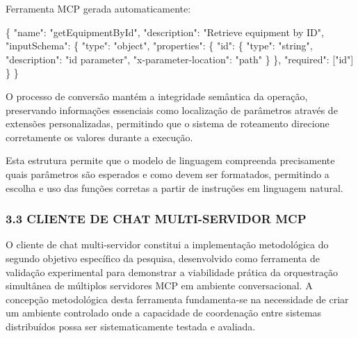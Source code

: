 \documentclass[
]{article}
\newenvironment{Shaded}{}{}
\newcommand{\DataTypeTok}[1]{\textcolor[rgb]{0.56,0.13,0.00}{#1}}
\newcommand{\FunctionTok}[1]{\textcolor[rgb]{0.02,0.16,0.49}{#1}}
\newcommand{\OtherTok}[1]{\textcolor[rgb]{0.00,0.44,0.13}{#1}}
\newcommand{\StringTok}[1]{\textcolor[rgb]{0.25,0.44,0.63}{#1}}
\begin{document}
Ferramenta MCP gerada automaticamente:

\begin{Shaded}
\begin{Highlighting}[]
\FunctionTok{\{}
  \DataTypeTok{"name"}\FunctionTok{:} \StringTok{"getEquipmentById"}\FunctionTok{,}
  \DataTypeTok{"description"}\FunctionTok{:} \StringTok{"Retrieve equipment by ID"}\FunctionTok{,}
  \DataTypeTok{"inputSchema"}\FunctionTok{:} \FunctionTok{\{}
    \DataTypeTok{"type"}\FunctionTok{:} \StringTok{"object"}\FunctionTok{,}
    \DataTypeTok{"properties"}\FunctionTok{:} \FunctionTok{\{}
      \DataTypeTok{"id"}\FunctionTok{:} \FunctionTok{\{}
        \DataTypeTok{"type"}\FunctionTok{:} \StringTok{"string"}\FunctionTok{,}
        \DataTypeTok{"description"}\FunctionTok{:} \StringTok{"id parameter"}\FunctionTok{,}
        \DataTypeTok{"x{-}parameter{-}location"}\FunctionTok{:} \StringTok{"path"}
      \FunctionTok{\}}
    \FunctionTok{\},}
    \DataTypeTok{"required"}\FunctionTok{:} \OtherTok{[}\StringTok{"id"}\OtherTok{]}
  \FunctionTok{\}}
\FunctionTok{\}}
\end{Highlighting}
\end{Shaded}

O processo de conversão mantém a integridade semântica da operação,
preservando informações essenciais como localização de parâmetros
através de extensões personalizadas, permitindo que o sistema de
roteamento direcione corretamente os valores durante a execução.

Esta estrutura permite que o modelo de linguagem compreenda precisamente
quais parâmetros são esperados e como devem ser formatados, permitindo a
escolha e uso das funções corretas a partir de instruções em linguagem
natural.

\subsubsection{3.3 CLIENTE DE CHAT MULTI-SERVIDOR
MCP}\label{cliente-de-chat-multi-servidor-mcp}

O cliente de chat multi-servidor constitui a implementação metodológica
do segundo objetivo específico da pesquisa, desenvolvido como ferramenta
de validação experimental para demonstrar a viabilidade prática da
orquestração simultânea de múltiplos servidores MCP em ambiente
conversacional. A concepção metodológica desta ferramenta fundamenta-se
na necessidade de criar um ambiente controlado onde a capacidade de
coordenação entre sistemas distribuídos possa ser sistematicamente
testada e avaliada.
\end{document}
